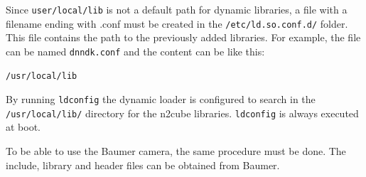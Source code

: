 Since \texttt{user/local/lib} is not a default path for dynamic libraries, a file with a filename ending with .conf must be created in the \texttt{/etc/ld.so.conf.d/} folder.
This file contains the path to the previously added libraries.
For example, the file can be named \texttt{dnndk.conf} and the content can be like this:
\begin{lstlisting}[style=bash, caption={}, label=lst:dnndk_conf_content]
  /usr/local/lib
\end{lstlisting}
By running \texttt{ldconfig} the dynamic loader is configured to search in the \texttt{/usr/local/lib/} directory for the \acrshort{n2cube} libraries.
\texttt{ldconfig} is always executed at boot.

To be able to use the Baumer camera, the same procedure must be done.
The include, library and header files can be obtained from Baumer.